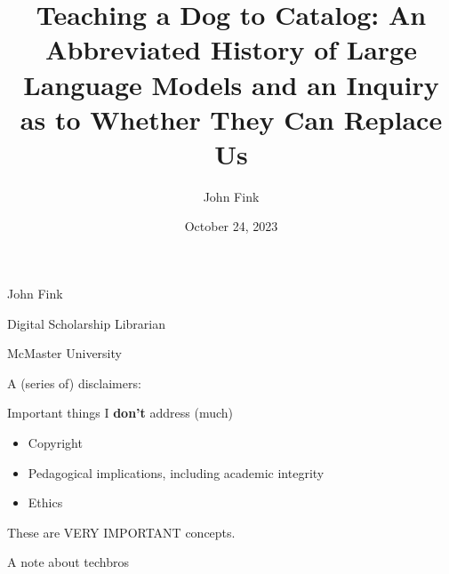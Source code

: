 \documentclass{beamer}
\title{Teaching a Dog to Catalog: An Abbreviated History of Large Language Models and an Inquiry as to Whether They Can Replace Us}
\author{John Fink}
\institute{McMaster University}
\date{October 24, 2023}
\begin{document}
\begin{frame}
    \maketitle
\end{frame}

\begin{frame}
	John Fink
	
	Digital Scholarship Librarian
	
	McMaster University
\end{frame}




\begin{frame}
	A (series of) disclaimers:
\end{frame}
 
 

 \begin{frame}[plain]
 \end{frame}

\begin{frame}{Important things I \textbf{don't} address (much)}
	\begin{itemize}
		\item Copyright
		\pause
		\item Pedagogical implications, including academic integrity
		\pause
		\item Ethics
	\end{itemize}
\end{frame}

\begin{frame}
	These are VERY IMPORTANT concepts.
\end{frame}

\begin{frame}{A note about techbros}

\end{frame}
\end{document}
